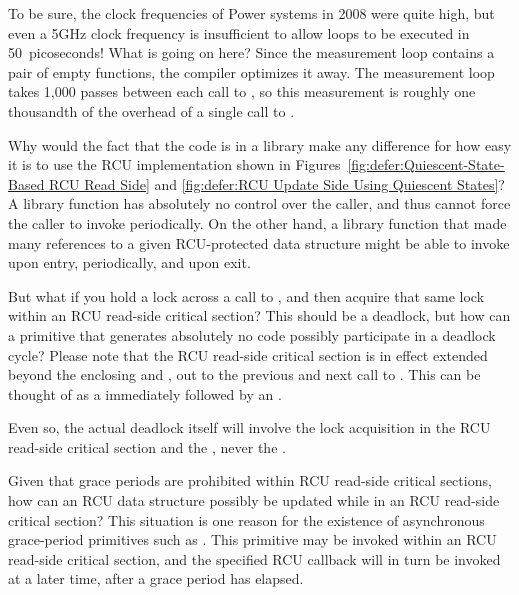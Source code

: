 \QuickQ{}
	To be sure, the clock frequencies of Power
	systems in 2008 were quite high, but even a 5GHz clock
	frequency is insufficient to allow
	loops to be executed in 50~picoseconds!
	What is going on here?
\QuickA{}
	Since the measurement loop contains a pair of empty functions,
	the compiler optimizes it away.
	The measurement loop takes 1,000 passes between each call to
	, so this measurement is roughly
	one thousandth of the overhead of a single call to
	.

\QuickQ{}
	Why would the fact that the code is in a library make
	any difference for how easy it is to use the RCU
	implementation shown in
	Figures~\ref{fig:defer:Quiescent-State-Based RCU Read Side} and
	\ref{fig:defer:RCU Update Side Using Quiescent States}?
\QuickA{}
	A library function has absolutely no control over the caller,
	and thus cannot force the caller to invoke 
	periodically.
	On the other hand, a library function that made many references
	to a given RCU-protected data structure might be able to invoke
	 upon entry,
	 periodically, and
	 upon exit.

\QuickQ{}
	But what if you hold a lock across a call to
	, and then acquire that same lock within
	an RCU read-side critical section?
	This should be a deadlock, but how can a primitive that
	generates absolutely no code possibly participate in a
	deadlock cycle?
\QuickA{}
	Please note that the RCU read-side critical section is in
	effect extended beyond the enclosing
	 and , out to
	the previous and next call to .
	This  can be thought of as a
	 immediately followed by an
	.

	Even so, the actual deadlock itself will involve the lock
	acquisition in the RCU read-side critical section and
	the , never the .

\QuickQ{}
	Given that grace periods are prohibited within RCU read-side
	critical sections, how can an RCU data structure possibly be
	updated while in an RCU read-side critical section?
\QuickA{}
	This situation is one reason for the existence of asynchronous
	grace-period primitives such as .
	This primitive may be invoked within an RCU read-side critical
	section, and the specified RCU callback will in turn be invoked
	at a later time, after a grace period has elapsed.

